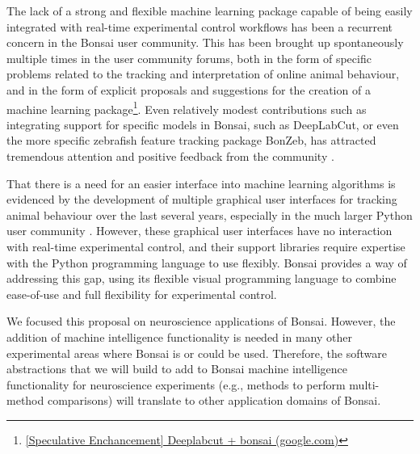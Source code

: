 The lack of a strong and
flexible machine learning package capable of being easily integrated with
real-time experimental control workflows has been a recurrent concern in the
Bonsai user community. This has been brought up spontaneously multiple times in
the user community forums, both in the form of specific problems related to the
tracking and interpretation of online animal behaviour, and in the form of
explicit proposals and suggestions for the creation of a machine learning
package\footnote{\href{https://groups.google.com/g/bonsai-users/c/BZ3zOOdv_1c/m/x6OP75frBQAJ?utm_medium=email&utm_source=footer&pli=1}{[Speculative
Enchancement] Deeplabcut + bonsai (google.com)}}. Even
relatively modest contributions such as integrating support for specific models
in Bonsai, such as DeepLabCut, or even the more specific zebrafish feature
tracking package BonZeb, has attracted tremendous attention and positive
feedback from the community \citep[e.g.,][]{kaneEtAl20,guilbeaultEtAl21}.

That there is a need for an easier interface into machine learning algorithms
is evidenced by the development of multiple graphical user interfaces for
tracking animal behaviour over the last several years, especially in the much
larger Python user community
\citep[e.g.,][]{walterAndCouzin21,guilbeaultEtAl21}. However, these graphical
user interfaces have no interaction with real-time experimental control, and
their support libraries require expertise with the Python programming language
to use flexibly. Bonsai provides a way of addressing this gap, using its
flexible visual programming language to combine ease-of-use and full
flexibility for experimental control.

We focused this proposal on neuroscience applications of Bonsai. However, the
addition of machine intelligence functionality is needed in many other
experimental areas where Bonsai is or could be used. Therefore, the software
abstractions that we will build to add to Bonsai machine intelligence
functionality for neuroscience experiments (e.g., methods to perform
multi-method comparisons) will translate to other application domains of
Bonsai.

